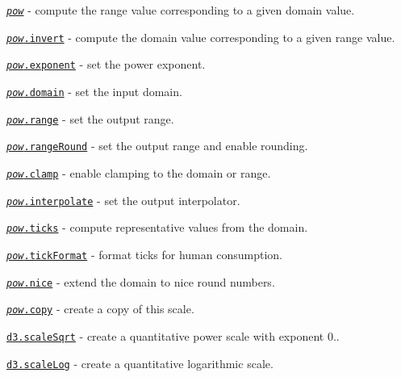 \begin{DoxyItemize}
\item \href{https://github.com/d3/d3-scale/blob/master/README.md#_pow}{\tt {\itshape pow}} -\/ compute the range value corresponding to a given domain value.
\item \href{https://github.com/d3/d3-scale/blob/master/README.md#pow_invert}{\tt {\itshape pow}.invert} -\/ compute the domain value corresponding to a given range value.
\item \href{https://github.com/d3/d3-scale/blob/master/README.md#pow_exponent}{\tt {\itshape pow}.exponent} -\/ set the power exponent.
\item \href{https://github.com/d3/d3-scale/blob/master/README.md#pow_domain}{\tt {\itshape pow}.domain} -\/ set the input domain.
\item \href{https://github.com/d3/d3-scale/blob/master/README.md#pow_range}{\tt {\itshape pow}.range} -\/ set the output range.
\item \href{https://github.com/d3/d3-scale/blob/master/README.md#pow_rangeRound}{\tt {\itshape pow}.range\+Round} -\/ set the output range and enable rounding.
\item \href{https://github.com/d3/d3-scale/blob/master/README.md#pow_clamp}{\tt {\itshape pow}.clamp} -\/ enable clamping to the domain or range.
\item \href{https://github.com/d3/d3-scale/blob/master/README.md#pow_interpolate}{\tt {\itshape pow}.interpolate} -\/ set the output interpolator.
\item \href{https://github.com/d3/d3-scale/blob/master/README.md#pow_ticks}{\tt {\itshape pow}.ticks} -\/ compute representative values from the domain.
\item \href{https://github.com/d3/d3-scale/blob/master/README.md#pow_tickFormat}{\tt {\itshape pow}.tick\+Format} -\/ format ticks for human consumption.
\item \href{https://github.com/d3/d3-scale/blob/master/README.md#pow_nice}{\tt {\itshape pow}.nice} -\/ extend the domain to nice round numbers.
\item \href{https://github.com/d3/d3-scale/blob/master/README.md#pow_copy}{\tt {\itshape pow}.copy} -\/ create a copy of this scale.
\item \href{https://github.com/d3/d3-scale/blob/master/README.md#scaleSqrt}{\tt d3.\+scale\+Sqrt} -\/ create a quantitative power scale with exponent 0..
\item \href{https://github.com/d3/d3-scale/blob/master/README.md#scaleLog}{\tt d3.\+scale\+Log} -\/ create a quantitative logarithmic scale.

\end{DoxyItemize}
